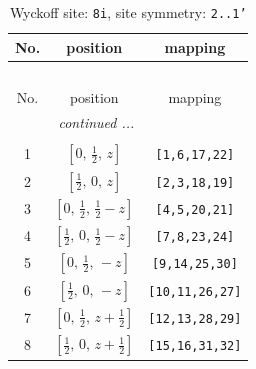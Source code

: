 \documentclass[fleqn,8pt]{jsarticle}
\begin{document}
\renewcommand{\arraystretch}{1.2}
\begin{longtable}{ccc}
\caption{Wyckoff site: {\tt 8i}, site symmetry: {\tt 2..1'}}
 \\
 \hline \hline
No. & position & mapping \\ \hline \endfirsthead

\multicolumn{2}{l}{\tablename\ \thetable{}} \\
 \hline \hline
No. & position & mapping \\ \hline \endhead

 \hline \hline
\multicolumn{2}{r}{\footnotesize\it continued ...} \\ \endfoot

 \hline \hline
\multicolumn{2}{r}{} \\ \endlastfoot

1 & $\left[ 0,\, \frac{1}{2},\, z \right]$ & {\tt [1,6,17,22]} \\ \hline
2 & $\left[ \frac{1}{2},\, 0,\, z \right]$ & {\tt [2,3,18,19]} \\ \hline
3 & $\left[ 0,\, \frac{1}{2},\, \frac{1}{2} - z \right]$ & {\tt [4,5,20,21]} \\ \hline
4 & $\left[ \frac{1}{2},\, 0,\, \frac{1}{2} - z \right]$ & {\tt [7,8,23,24]} \\ \hline
5 & $\left[ 0,\, \frac{1}{2},\, - z \right]$ & {\tt [9,14,25,30]} \\ \hline
6 & $\left[ \frac{1}{2},\, 0,\, - z \right]$ & {\tt [10,11,26,27]} \\ \hline
7 & $\left[ 0,\, \frac{1}{2},\, z + \frac{1}{2} \right]$ & {\tt [12,13,28,29]} \\ \hline
8 & $\left[ \frac{1}{2},\, 0,\, z + \frac{1}{2} \right]$ & {\tt [15,16,31,32]} \\
\end{longtable}
\renewcommand{\arraystretch}{1.2}
\end{document}
